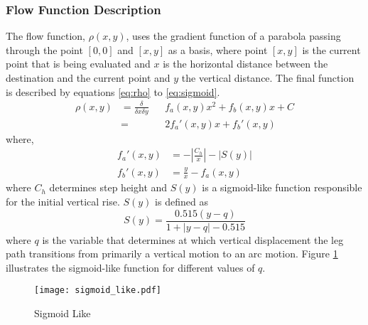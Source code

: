             \subsubsection{Flow Function Description} \label{sec:flow_function}
                The flow function, \(\rho(x,y)\), uses the gradient function of a parabola passing through the point \([0,0]\) and \([x,y]\) as a basis, where point \([x,y]\)
                is the current point that is being evaluated and \(x\) is the horizontal distance between the destination and the current point and \(y\) the
                vertical distance. The final function is described by equations \ref{eq:rho} to \ref{eq:sigmoid}.
                \begin{equation} \label{eq:rho}
                    \begin{aligned}
                        \rho(x,y) &= \frac{\delta}{\delta x\delta y}&&f_a(x,y)x^2 + f_b(x,y)x + C\\
                        &= &&2f_a'(x,y)x + f_b'(x,y)    
                    \end{aligned}
                \end{equation}
                where, %
                \begin{align} \label{eq:fa}
                    f_a'(x,y) &= -\left|\frac{C_h}{x}\right| - \left|S(y)\right|\\
                    f_b'(x,y) &= \frac{y}{x} - f_a(x,y)
                \end{align}
                where \(C_h\) determines step height and \(S(y)\) is a sigmoid-like function responsible for the initial vertical rise. \(S(y)\) is defined as
                \begin{equation} \label{eq:sigmoid}
                    S(y) = \frac{0.515(y-q)}{1+\left|y-q\right|-0.515}
                \end{equation}
                where \(q\) is the variable that determines at which vertical displacement the leg path transitions from primarily a vertical motion to an arc motion. Figure \ref{fig:sigmoid_like} illustrates the sigmoid-like function for different values of \(q\).
                \begin{figure}[h]
                    \centering
                    \hspace{-1.38cm}
                    \texttt{[image: sigmoid\_like.pdf]}
                    \caption{Sigmoid Like}
                    \label{fig:sigmoid_like}
                \end{figure}

